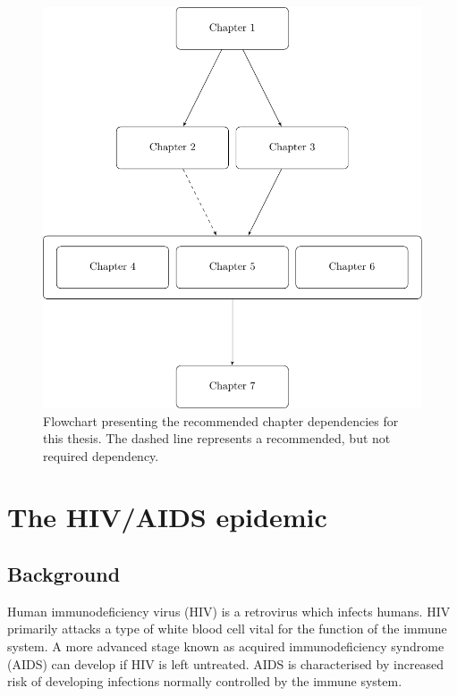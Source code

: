 \documentclass[a4paper, nobind]{templates/ociamthesis}
\begin{document}
\begin{figure}

{\centering \includegraphics[width=0.95\linewidth]{figures/chapter-flowchart} 

}

\caption{Flowchart presenting the recommended chapter dependencies for this thesis. The dashed line represents a recommended, but not required dependency.}\label{fig:chapter-flowchart}
\end{figure}

\hypertarget{hiv-aids}{%
\chapter{The HIV/AIDS epidemic}\label{hiv-aids}}

\adjustmtc
{}

\hypertarget{background}{%
\section{Background}\label{background}}

Human immunodeficiency virus (HIV) is a retrovirus which infects humans.
HIV primarily attacks a type of white blood cell vital for the function of the immune system.
A more advanced stage known as acquired immunodeficiency syndrome (AIDS) can develop if HIV is left untreated.
AIDS is characterised by increased risk of developing infections normally controlled by the immune system.
\end{document}
